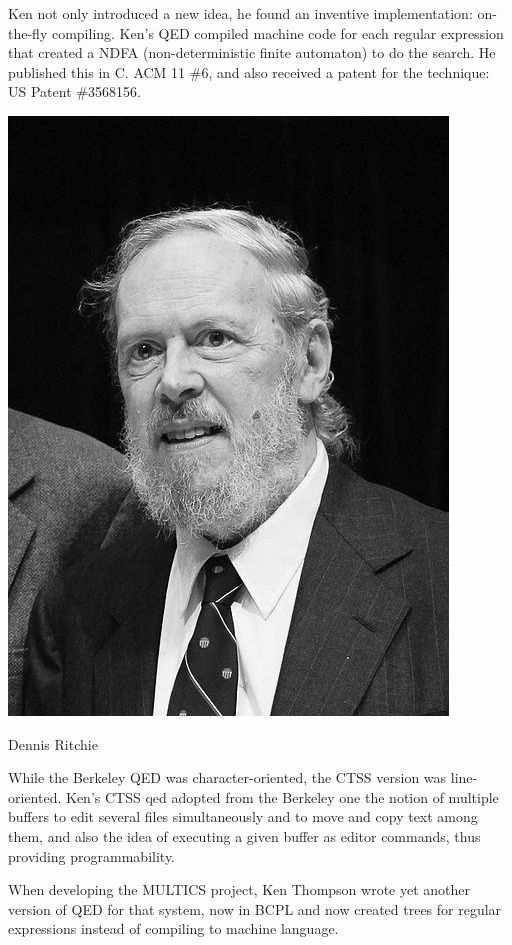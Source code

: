 Ken not only introduced a new idea, he found an inventive implementation: on-the-fly compiling. Ken's QED compiled machine code for each regular expression that created a NDFA (non-deterministic finite automaton) to do the search. He published this in C. ACM 11 \#6, and also received a patent for the technique: US Patent \#3568156.

\begin{marginfigure}
  \includegraphics{images/png/ritchie.png}
	\caption{Dennis Ritchie}
\end{marginfigure}

While the Berkeley QED was character-oriented, the CTSS version was line-oriented. Ken's CTSS qed adopted from the Berkeley one the notion of multiple buffers to edit several files simultaneously and to move and copy text among them, and also the idea of executing a given buffer as editor commands, thus providing programmability.

When developing the MULTICS project, Ken Thompson wrote yet another version of QED for that system, now in BCPL
and now created trees for regular expressions instead of compiling to machine language.

